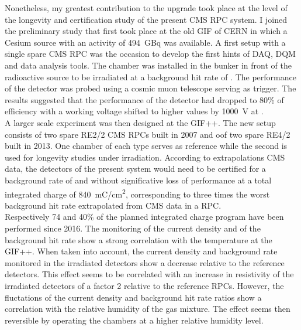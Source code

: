 	Nonetheless, my greatest contribution to the upgrade took place at the level of the longevity and certification study of the present CMS RPC system. I joined the preliminary study that first took place at the old \acl{GIF} of CERN in which a Cesium source with an activity of \SI{494}{GBq} was available. A first setup with a single spare CMS RPC was the occasion to develop the first hints of \acl{DAQ}, \acl{DQM} and data analysis tools. The chamber was installed in the bunker in front of the radioactive source to be irradiated at a background hit rate of . The performance of the detector was probed using a cosmic muon telescope serving as trigger. The results suggested that the performance of the detector had dropped to 80\% of efficiency with a working voltage shifted to higher values by \SI{1000}{V} at .\\
	A larger scale experiment was then designed at the GIF++. The new setup consists of two spare RE2/2 CMS RPCs built in 2007 and oof two spare RE4/2 built in 2013. One chamber of each type serves as reference while the second is used for longevity studies under irradiation. According to extrapolations CMS data, the detectors of the present system would need to be certified for a background rate of  and without significative loss of performance at a total integrated charge of \SI{840}{mC/cm^2}, corresponding to three times the worst background hit rate extrapolated from CMS data in a RPC.\\
	Respectively 74 and 40\% of the planned integrated charge program have been performed since 2016. The monitoring of the current density and of the background hit rate show a strong correlation with the temperature at the GIF++. When taken into account, the current density and background rate monitored in the irradiated detectors show a decrease relative to the reference detectors. This effect seems to be correlated with an increase in resistivity of the irradiated detectors of a factor 2 relative to the reference RPCs. However, the fluctations of the current density and background hit rate ratios show a correlation with the relative humidity of the gas mixture. The effect seems then reversible by operating the chambers at a higher relative humidity level.\\
